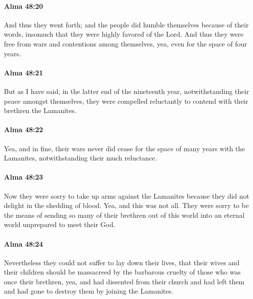 		\paragraph{Alma 48:20} %
			\label{ALMA-48-20}

			And thus they went forth;
			and the people did humble themselves because of their words,
			insomuch that they were highly favored of the Lord.
			And thus they were free from wars and contentions among themselves,
			yea, even for the space of four years.

		\paragraph{Alma 48:21} %
			\label{ALMA-48-21}

			But as I have said, in the latter end of the nineteenth year,
			notwithstanding their peace amongst themselves,
			they were compelled reluctantly to contend with their brethren the Lamanites.

		\paragraph{Alma 48:22} %
			\label{ALMA-48-22}

			Yea, and in fine, their wars never did cease for the space of many years
			with the Lamanites,
			notwithstanding their much reluctance.

		\paragraph{Alma 48:23} %
			\label{ALMA-48-23}

			Now they were sorry to take up arms against the Lamanites
			because they did not delight in the shedding of blood.
			Yea, and this was not all.
			They were sorry to be the means of sending so many of their brethren
			out of this world into an eternal world unprepared to meet their God.

		\paragraph{Alma 48:24} %
			\label{ALMA-48-24}

			Nevertheless they could not suffer to lay down their lives,
			that their wives and their children should be massacreed
			by the barbarous cruelty of those who was once their brethren,
			yea, and had dissented from their church
			and had left them and had gone to destroy them by joining the Lamanites.

